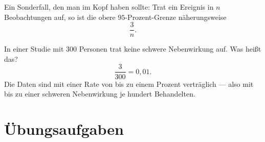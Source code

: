\begin{merksatz}
Ein Sonderfall, den man im Kopf haben sollte: Trat ein Ereignis in $n$ Beobachtungen  auf, so ist die obere $95$-Prozent-Grenze näherungsweise
\[ \frac{3}{n} . \]

In einer Studie mit $300$ Personen trat keine schwere Nebenwirkung auf. Was heißt das?
\[ \frac{3}{300} = 0{,}01 . \]
Die Daten sind mit einer Rate von bis zu einem Prozent verträglich --- also mit bis zu einer schweren Nebenwirkung je hundert Behandelten.

\begin{center}
\begin{minipage}{0.88\textwidth}
\end{minipage}
\end{center}
\end{merksatz}

\section{Übungsaufgaben}

